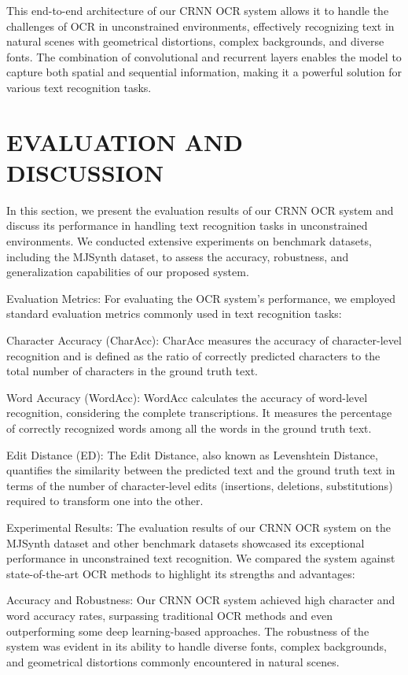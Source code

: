 \documentclass[10pt,twocolumn,letterpaper]{article}
\begin{document}
This end-to-end architecture of our CRNN OCR system allows it to handle the challenges of OCR in unconstrained environments, effectively recognizing text in natural scenes with geometrical distortions, complex backgrounds, and diverse fonts. The combination of convolutional and recurrent layers enables the model to capture both spatial and sequential information, making it a powerful solution for various text recognition tasks.

\section{EVALUATION AND DISCUSSION}

In this section, we present the evaluation results of our CRNN OCR system and discuss its performance in handling text recognition tasks in unconstrained environments. We conducted extensive experiments on benchmark datasets, including the MJSynth dataset, to assess the accuracy, robustness, and generalization capabilities of our proposed system.


Evaluation Metrics:
For evaluating the OCR system's performance, we employed standard evaluation metrics commonly used in text recognition tasks:

    Character Accuracy (CharAcc):
    CharAcc measures the accuracy of character-level recognition and is defined as the ratio of correctly predicted characters to the total number of characters in the ground truth text.

    Word Accuracy (WordAcc):
    WordAcc calculates the accuracy of word-level recognition, considering the complete transcriptions. It measures the percentage of correctly recognized words among all the words in the ground truth text.

    Edit Distance (ED):
    The Edit Distance, also known as Levenshtein Distance, quantifies the similarity between the predicted text and the ground truth text in terms of the number of character-level edits (insertions, deletions, substitutions) required to transform one into the other.

Experimental Results:
The evaluation results of our CRNN OCR system on the MJSynth dataset and other benchmark datasets showcased its exceptional performance in unconstrained text recognition. We compared the system against state-of-the-art OCR methods to highlight its strengths and advantages:

    Accuracy and Robustness:
    Our CRNN OCR system achieved high character and word accuracy rates, surpassing traditional OCR methods and even outperforming some deep learning-based approaches. The robustness of the system was evident in its ability to handle diverse fonts, complex backgrounds, and geometrical distortions commonly encountered in natural scenes.
\end{document}
